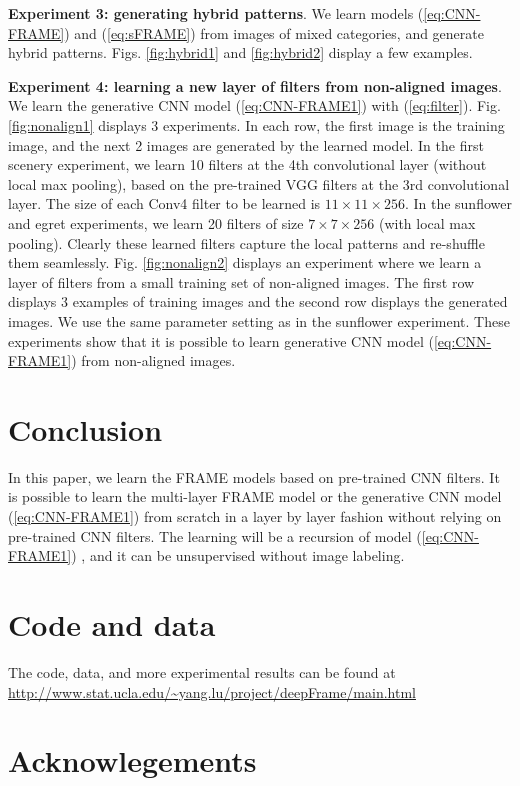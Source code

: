 \documentclass[letterpaper]{article}
\begin{document}
{\bf Experiment 3: generating hybrid patterns}. We  learn models (\ref{eq:CNN-FRAME}) and  (\ref{eq:sFRAME}) from images of mixed categories, and generate hybrid patterns. Figs. \ref{fig:hybrid1} and \ref{fig:hybrid2} display a few examples. 


{\bf Experiment 4: learning a new layer of filters from non-aligned images}.  We learn the generative CNN model (\ref{eq:CNN-FRAME1}) with (\ref{eq:filter}). Fig. \ref{fig:nonalign1} displays 3 experiments. In each row, the first image is the training image, and the next 2 images are generated by the learned model. In the first scenery experiment, we learn 10 filters at the 4th convolutional layer (without local max pooling), based on the pre-trained VGG filters at the 3rd convolutional layer. The size of each Conv4 filter to be learned is $11 \times 11 \times 256$. In the sunflower and egret experiments, we learn 20 filters of size $7 \times 7 \times 256$ (with local max pooling).  Clearly these learned filters capture the local patterns and re-shuffle them seamlessly. Fig. \ref{fig:nonalign2} displays an experiment where we learn a layer of filters from a small training set of non-aligned images. The first row displays 3 examples of training images and the second row displays the generated images. We use the same parameter setting as in the sunflower experiment. These experiments show that it is possible to learn generative CNN model (\ref{eq:CNN-FRAME1}) from non-aligned images.

\section{Conclusion}

In this paper, we learn the FRAME models based on pre-trained CNN filters. It is possible to learn the multi-layer FRAME model or the generative CNN model (\ref{eq:CNN-FRAME1})  from scratch in a layer by layer fashion without relying on pre-trained CNN filters. The learning will be a recursion of model (\ref{eq:CNN-FRAME1}) , and it can be unsupervised without image labeling. 


\section*{Code and data}


The code, data, and more experimental results can be found at {\url{http://www.stat.ucla.edu/~yang.lu/project/deepFrame/main.html} }


\section*{Acknowlegements}
\end{document}
